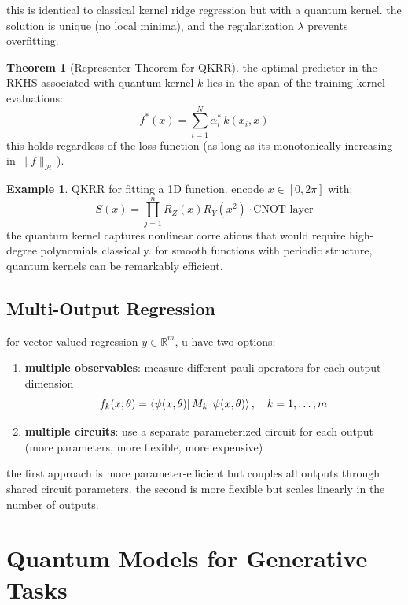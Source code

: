 \documentclass[11pt,a4paper]{article}
\theoremstyle{definition}
\newtheorem{example}{Example}[section]
\newtheorem{theorem}{Theorem}[section]
\theoremstyle{remark}
\begin{document}
this is identical to classical kernel ridge regression but with a quantum kernel. the solution is unique (no local minima), and the regularization $\lambda$ prevents overfitting.

\begin{theorem}[Representer Theorem for QKRR]
the optimal predictor in the RKHS associated with quantum kernel $k$ lies in the span of the training kernel evaluations:
\[
f^*(x) = \sum_{i=1}^{N} \alpha_i^* \, k(x_i, x)
\]
this holds regardless of the loss function (as long as its monotonically increasing in $\|f\|_{\mathcal{H}}$).
\end{theorem}

\begin{example}
QKRR for fitting a 1D function. encode $x \in [0, 2\pi]$ with:
\[
S(x) = \prod_{j=1}^{n} R_Z(x) R_Y(x^2) \cdot \text{CNOT layer}
\]
the quantum kernel captures nonlinear correlations that would require high-degree polynomials classically. for smooth functions with periodic structure, quantum kernels can be remarkably efficient.
\end{example}

\subsection{Multi-Output Regression}

for vector-valued regression $y \in \mathbb{R}^m$, u have two options:

\begin{enumerate}[label=\arabic*.]
    \item \textbf{multiple observables}: measure different pauli operators for each output dimension
    \begin{equation}
        f_k(x; \theta) = \bra{\psi(x, \theta)} M_k \ket{\psi(x, \theta)}, \quad k = 1, \ldots, m
    \end{equation}

    \item \textbf{multiple circuits}: use a separate parameterized circuit for each output (more parameters, more flexible, more expensive)
\end{enumerate}

the first approach is more parameter-efficient but couples all outputs through shared circuit parameters. the second is more flexible but scales linearly in the number of outputs.

\section{Quantum Models for Generative Tasks}
\end{document}

